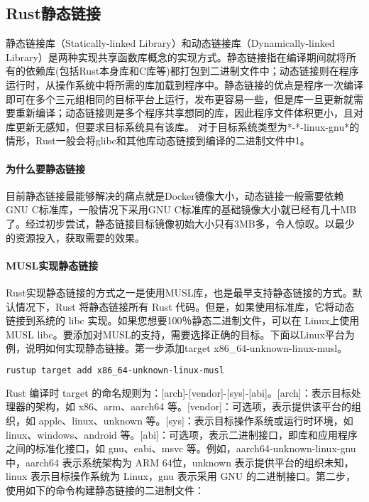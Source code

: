 \documentclass[../../../dolphin-book-2023.tex]{subfiles}
\begin{document}
\subsection{Rust静态链接}

静态链接库（Statically-linked Library）和动态链接库（Dynamically-linked Library）是两种实现共享函数库概念的实现方式。静态链接指在编译期间就将所有的依赖库(包括Rust本身库和C库等)都打包到二进制文件中；动态链接则在程序运行时，从操作系统中将所需的库加载到程序中。静态链接的优点是程序一次编译即可在多个三元组相同的目标平台上运行，发布更容易一些，但是库一旦更新就需要重新编译；动态链接则是多个程序共享想同的库，因此程序文件体积更小，且对库更新无感知，但要求目标系统具有该库。 对于目标系统类型为*-*-linux-gnu*的情形，Rust一般会将glibc和其他库动态链接到编译的二进制文件中1。

\paragraph{为什么要静态链接}

目前静态链接最能够解决的痛点就是Docker镜像大小，动态链接一般需要依赖GNU C标准库，一般情况下采用GNU C标准库的基础镜像大小就已经有几十MB了。经过初步尝试，静态链接目标镜像初始大小只有3MB多，令人惊叹。以最少的资源投入，获取需要的效果。

\paragraph{MUSL实现静态链接}

Rust实现静态链接的方式之一是使用MUSL库，也是最早支持静态链接的方式。默认情况下，Rust 将静态链接所有 Rust 代码。但是，如果使用标准库，它将动态链接到系统的 libc 实现。如果您想要100％静态二进制文件，可以在 Linux上使用 MUSL libc。要添加对MUSL的支持，需要选择正确的目标。下面以Linux平台为例，说明如何实现静态链接。第一步添加target x86\_64-unknown-linux-musl。

\begin{lstlisting}[language=Bash]
rustup target add x86_64-unknown-linux-musl
\end{lstlisting}

Rust 编译时 target 的命名规则为：[arch]-[vendor]-[sys]-[abi]。[arch]：表示目标处理器的架构，如 x86、arm、aarch64 等。[vendor]：可选项，表示提供该平台的组织，如 apple、linux、unknown 等。[sys]：表示目标操作系统或运行时环境，如 linux、windows、android 等。[abi]：可选项，表示二进制接口，即库和应用程序之间的标准化接口，如 gnu、eabi、msvc 等。例如，aarch64-unknown-linux-gnu 中，aarch64 表示系统架构为 ARM 64位，unknown 表示提供平台的组织未知，linux 表示目标操作系统为 Linux，gnu 表示采用 GNU 的二进制接口。第二步，使用如下的命令构建静态链接的二进制文件：
\end{document}
